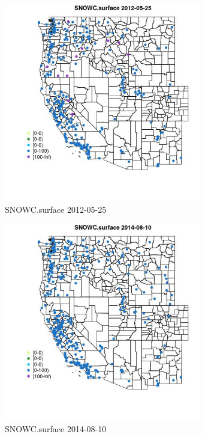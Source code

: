\begin{figure} 
\centering  
\includegraphics[width=0.77\textwidth]{Code_Outputs/Report_ML_input_PM25_Step4_part_e_de_duplicated_aves_compiled_2019-05-18wNAs_MapObsSNOWCsurface2012-05-25.jpg} 
\caption{\label{fig:Report_ML_input_PM25_Step4_part_e_de_duplicated_aves_compiled_2019-05-18wNAsMapObsSNOWCsurface2012-05-25}SNOWC.surface 2012-05-25} 
\end{figure} 
 

\begin{figure} 
\centering  
\includegraphics[width=0.77\textwidth]{Code_Outputs/Report_ML_input_PM25_Step4_part_e_de_duplicated_aves_compiled_2019-05-18wNAs_MapObsSNOWCsurface2014-08-10.jpg} 
\caption{\label{fig:Report_ML_input_PM25_Step4_part_e_de_duplicated_aves_compiled_2019-05-18wNAsMapObsSNOWCsurface2014-08-10}SNOWC.surface 2014-08-10} 
\end{figure} 
 

